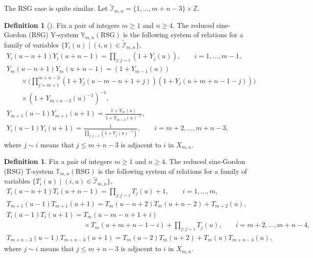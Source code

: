 \documentclass[pdftex]{sigma}
\numberwithin{equation}{section}
\theoremstyle{definition}
\newtheorem{Definition}[Theorem]{Definition}
\begin{document}
The RSG case is quite similar.
Let $\tilde{\mathcal{I}}_{m,n}=\{1,\dots,m+n-3\}\times \mathbb{Z}$.

\begin{Definition}[\cite{Tateo95}]
Fix a pair of integers $m \geq 1$ and $n \geq 4$.
The reduced sine-Gordon (RSG)
Y-system $\mathbb{Y}_{m,n}(\mathrm{RSG})$
is the following system of relations for
a family of variables
 $\{Y_i(u) \mid (i,u)\in \tilde{\mathcal{I}}_{m,n} \}$,
\begin{gather*}
Y_i(u-n+1)Y_i(u+n-1)
=\prod_{j:j\sim i} (1+Y_j(u)),
\qquad i=1,\dots,m-1,
\nonumber\\
Y_m\left(u-n+1\right)
Y_m\left(u+n-1\right)
= (1+Y_{m-1}(u))
\nonumber\\
\qquad {}\times
\Biggl(\prod_{j=m+1}^{m+n-3} (1+Y_j(u-m-n+1+j))
(1+Y_j(u+m+n-1-j))\Biggr)\nonumber\\
\qquad{} \times (1+Y_{m+n-3} (u)^{-1})^{-1},
\nonumber\\
Y_{m+1}(u-1) Y_{m+1}(u+1)
=
\frac
{1+Y_m(u)}
{1+Y_{m+2}(u)^{-1}}
,\nonumber\\
Y_i(u-1)Y_i(u+1)
=
\frac{1}
{\prod\limits_{j:j\sim i} (1+Y_j(u)^{-1})
},
\qquad i=m+2,\dots,m+n-3,%
\end{gather*}
where $j\sim i$ means that $j\leq m+n-3$ is adjacent to $i$ in $X_{m,n}$.
\end{Definition}

\begin{Definition}
Fix a pair of integers $m \geq 1$ and $n \geq 4$.
The reduced sine-Gordon (RSG)
T-system $\mathbb{T}_{m,n}(\mathrm{RSG})$
is the following system of relations for
a family of variables
 $\{T_i(u) \mid (i,u)\in \tilde{\mathcal{I}}_{m,n} \}$,
\begin{gather*}
T_i(u-n+1)T_i(u+n-1)
=
\prod_{j:j\sim i} T_j(u)+1,
\qquad i=1,\dots,m,\nonumber\\
T_{m+1}(u-1) T_{m+1}(u+1)
=
T_m(u-n+2)T_m(u+n-2)+T_{m+2}(u),
\nonumber\\
T_i(u-1)T_i(u+1)= T_m(u-m-n+1+i)\nonumber\\
\phantom{T_i(u-1)T_i(u+1)=}{}\times T_m(u+m+n-1-i)
+ \!\prod_{j: j\sim i} T_j(u), \!\qquad i=m+2,\dots,m+n-4,
\nonumber\\
T_{m+n-3}(u-1)T_{m+n-3}(u+1)
=
T_{m}(u-2)T_{m}(u+2) +T_{m}(u) T_{m+n-4}(u),%
\end{gather*}
where $j\sim i$ means that $j\leq m+n-3$ is adjacent to $i$ in $X_{m,n}$.
\end{Definition}
\end{document}
